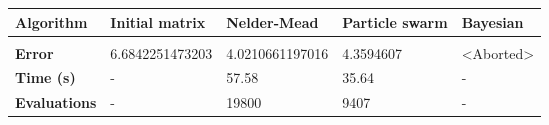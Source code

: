 \begin{table}[h]
	\begin{tabular}{p{2cm}|l|l|l|l}
		\textbf{Algorithm} 		& \textbf{Initial matrix} & \textbf{Nelder-Mead} 		& \textbf{Particle swarm} 	& \textbf{Bayesian} \\
		\hline \\
		\textbf{Error}	& 6.6842251473203 & 4.0210661197016	& 4.3594607 & \cellcolor{red}<Aborted> \\
		\textbf{Time (s)} & - & 57.58 & 35.64 & \cellcolor{red}- \\
		\textbf{Evaluations} & - & 19800 & 9407 & \cellcolor{red}- \\
	\end{tabular}
\end{table}